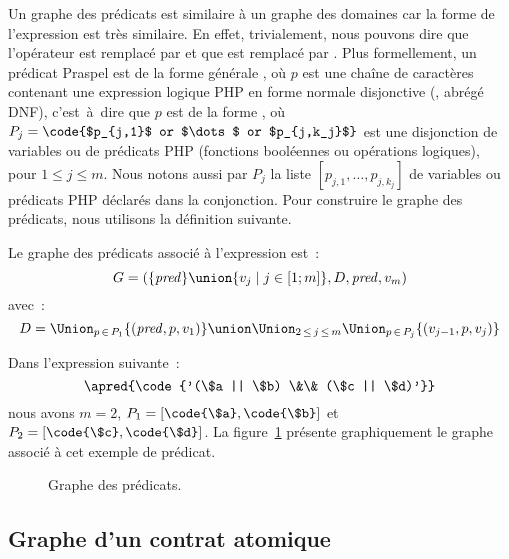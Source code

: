 Un graphe des prédicats est similaire à un graphe des domaines car la forme de
l'expression est très similaire. En effet, trivialement, nous pouvons dire que
l'opérateur  est remplacé par \code{\&\&} et que  est
remplacé par \code{||}. Plus formellement, un prédicat Praspel est de la forme
générale , où $p$ est une chaîne de caractères contenant une expression
logique PHP en forme normale disjonctive (,
abrégé DNF), c'est~à~dire que $p$ est de la forme , où $P_j = \code{$p_{j,1}$ or $\dots$ or $p_{j,k_j}$}$ est une
disjonction de variables ou de prédicats PHP (fonctions booléennes ou opérations
logiques), pour $1 \leq j \leq m$. Nous notons aussi par $P_j$ la liste
$[p_{j,1}, \dots, p_{j,k_j}]$ de variables ou prédicats PHP déclarés dans la
conjonction.  Pour construire le graphe des prédicats, nous utilisons la
définition suivante.

\begin{definition}

Le {\strong graphe des prédicats} associé à l'expression  est~:
%
$$G = (\{\mathit{pred}\} \union \{v_j \;\vert\; j \in [1; m]\}, D, \mathit{pred}, v_m)$$
%
avec~:
%
$$D = \Union_{p \,\in\, P_1} \{(\mathit{pred}, p, v_1)\} \union
      \Union_{2 \,\leq\, j \,\leq\, m}
      \Union_{p \,\in\, P_j} \{(v_{j - 1}, p, v_j)\}$$

\end{definition}

\begin{example}
\label{example:test:expression_graph2}

Dans l'expression suivante~:
%
$$\apred{\code{'(\$a || \$b) \&\& (\$c || \$d)'}}$$
%
nous avons $m = 2$, $P_1 = [\code{\$a}, \code{\$b}]$ et $P_2 = [\code{\$c},
\code{\$d}]$. La figure~\ref{figure:test:predicate_graph} présente graphiquement
le graphe associé à cet exemple de prédicat.

\end{example}

\begin{figure}


\caption{\label{figure:test:predicate_graph} Graphe des prédicats.}

\end{figure}

\subsection{Graphe d'un contrat atomique}
\label{subsection:test:atomic_graph}

